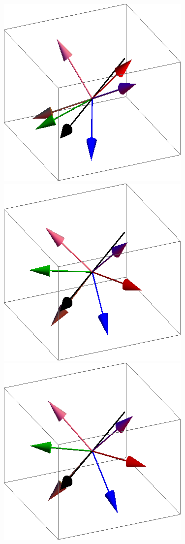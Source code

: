 \documentclass{article}
\begin{document}
\begin{figure}[ht]
\centering
\includegraphics[scale=0.32]{110/1S005to000G.png}
\includegraphics[scale=0.32]{110/2S005to000G.png}
\includegraphics[scale=0.32]{110/200S005to000G.png}

\end{figure}
\end{document}
